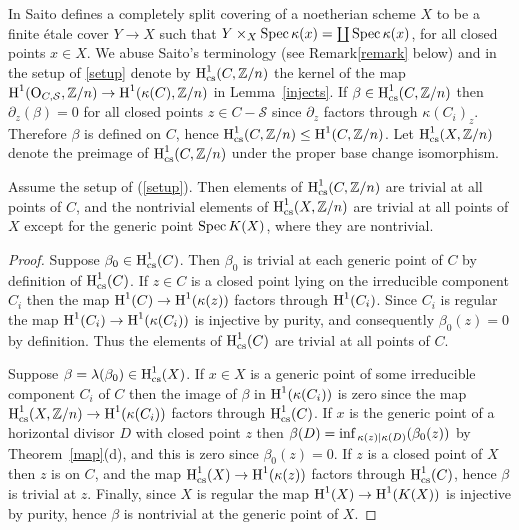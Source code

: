 \documentclass{amsart}
\theoremstyle{plain}
\theoremstyle{definition}
\theoremstyle{remark}
\numberwithin{equation}{section}%
\renewcommand{\H}{{\text{\rm H}}}
\renewcommand{\O}{{\text{\rm O}}}
\renewcommand{\S}{{\mathcal S}}
\newcommand{\Z}{{\mathbb Z}}
\newcommand{\cs}{{\text{\rm cs}}}
\renewcommand{\inf}{{\text{\rm inf}\,}}
\newcommand{\Spec}{{\text{\rm Spec}\,}}
\begin{document}
In \cite[2.1]{Sai85} Saito defines a completely split covering
of a noetherian scheme $X$ to be a finite \'etale cover $Y\to X$ such that 
$Y\times_X \Spec \kappa(x)=\coprod\Spec\kappa(x)$, for all closed points $x\in X$. 
We abuse Saito's terminology (see Remark\eqref{remark} below) and in the setup of \eqref{setup} denote by
$\H^1_\cs(C,\Z/n)$ the kernel of the map $\H^1(\O_{C,\S},\Z/n)\to\H^1(\kappa(C),\Z/n)$
in Lemma~\ref{injects}.
If $\beta\in\H^1_\cs(C,\Z/n)$ then $\partial_z(\beta)=0$ for all closed points $z\in C-\S$ since
$\partial_z$ factors through $\kappa(C_i)_z$.
Therefore $\beta$ is defined on $C$, hence $\H^1_\cs(C,\Z/n)\leq\H^1(C,\Z/n)$.
Let $\H^1_\cs(X,\Z/n)$ denote the preimage of $\H^1_\cs(C,\Z/n)$ under the proper
base change isomorphism.

\Proposition\label{cs}
Assume the setup of (\ref{setup}).
Then elements of $\H^1_\cs(C,\Z/n)$ are trivial at all points of $C$,
and the nontrivial elements of $\H^1_\cs(X,\Z/n)$ are trivial at all points of $X$ except for the
generic point $\Spec K(X)$, where they are nontrivial.
\rm

\begin{proof}
Suppose $\beta_0\in\H^1_\cs(C)$.
Then $\beta_0$ is trivial at each generic point of $C$ by definition of $\H^1_\cs(C)$.
If $z\in C$ is a closed point lying on the irreducible component $C_i$ then
the map $\H^1(C)\to\H^1(\kappa(z))$ factors through $\H^1(C_i)$.
Since $C_i$ is regular the map $\H^1(C_i)\to\H^1(\kappa(C_i))$ is injective by purity, 
and consequently $\beta_0(z)=0$ by definition.
Thus the elements of $\H^1_\cs(C)$ are trivial at all points of $C$.

Suppose $\beta=\lambda(\beta_0)\in\H^1_\cs(X)$.
If $x\in X$ is a generic point of some irreducible component
$C_i$ of $C$ then the image of $\beta$ in $\H^1(\kappa(C_i))$
is zero since the map $\H^1_\cs(X,\Z/n)\to\H^1(\kappa(C_i))$ factors through $\H^1_\cs(C)$.
If $x$ is the generic point of a horizontal divisor $D$ with closed point $z$ then 
$\beta(D)=\inf_{\kappa(z)|\kappa(D)}(\beta_0(z))$ by Theorem~\ref{map}(d),
and this is zero since $\beta_0(z)=0$.
If $z$ is a closed point of $X$ then $z$ is on $C$,
and the map $\H^1_\cs(X)\to\H^1(\kappa(z))$ factors through $\H^1_\cs(C)$, hence $\beta$
is trivial at $z$.
Finally, since $X$ is regular the map $\H^1(X)\to\H^1(K(X))$ is injective by purity,
hence $\beta$ is nontrivial at the generic point of $X$.
\end{proof}
\end{document}
